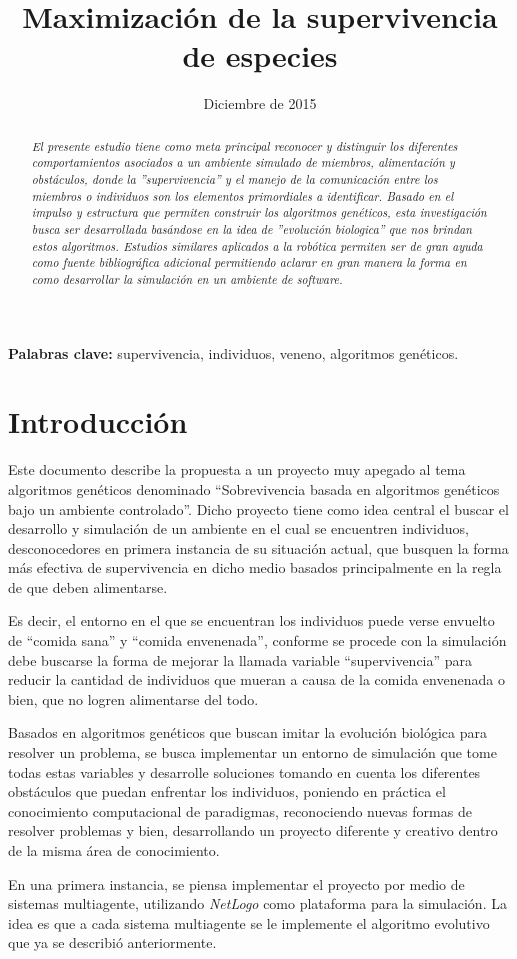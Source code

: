 \documentclass[times,10pt,twocolumn]{article}
\title{\textbf{Maximización de la supervivencia de especies}}
\author{Fabián Rodríguez$^1$ y José Pablo Ureña$^2$\\
   \emph{CI-1441 Paradigmas computacionales}\\
   \emph{Escuela de Ciencias de la Computación e Informática}\\
   \emph{Facultad de Ingeniería}\\
   \emph{Universidad de Costa Rica}\\
   $^1$\emph{\href{mailto:farodriguez.49@gmail.com}{farodriguez.49@gmail.com} }, $^2$\emph{\href{mailto:jp.urenag@gmail.com}{jp.urenag@gmail.com}}$}
\date{Diciembre de 2015}
\begin{document}
\maketitle

\begin{abstract}
\emph{El presente estudio tiene como meta principal reconocer y distinguir los diferentes comportamientos asociados a un ambiente simulado de miembros, alimentación y obstáculos, donde la ''supervivencia'' y el manejo de la comunicación entre los miembros o individuos son los elementos primordiales a identificar. Basado en el impulso y estructura que permiten construir los algoritmos genéticos, esta investigación busca ser desarrollada basándose en la idea de ''evolución biologica'' que nos brindan estos algoritmos. Estudios similares aplicados a la robótica permiten ser de gran ayuda como fuente bibliográfica adicional permitiendo aclarar en gran manera la forma en como desarrollar la simulación en un ambiente de software.}\\
\end{abstract}

\noindent \textbf{Palabras clave: }supervivencia, individuos, veneno, algoritmos genéticos. 

\section{Introducción}
  Este documento describe la propuesta a un proyecto muy apegado al tema algoritmos genéticos denominado “Sobrevivencia basada en algoritmos genéticos bajo un ambiente controlado”.
Dicho proyecto tiene como idea central el buscar el desarrollo y simulación de un ambiente en el cual se encuentren individuos, desconocedores en primera instancia de su situación actual, que busquen la forma más efectiva de supervivencia en dicho medio basados principalmente en la regla de que deben alimentarse.\par
Es decir, el entorno en el que se encuentran los individuos puede verse envuelto de “comida sana” y “comida envenenada”, conforme se procede con la simulación debe buscarse la forma de mejorar la llamada variable “supervivencia”  para reducir la cantidad de individuos que mueran a causa de la comida envenenada o bien, que no logren alimentarse del todo.\par
Basados en algoritmos genéticos que buscan imitar la evolución biológica para resolver un problema, se busca implementar un entorno de simulación que tome todas estas variables y desarrolle soluciones tomando en cuenta los diferentes obstáculos que puedan enfrentar los individuos, poniendo en práctica el conocimiento computacional de paradigmas, reconociendo nuevas formas de resolver problemas y bien, desarrollando un proyecto diferente y creativo dentro de la misma área de conocimiento.\par 
En una primera instancia, se piensa implementar el proyecto por medio de sistemas multiagente, utilizando \emph{NetLogo} como plataforma para la simulación. La idea es que a cada sistema multiagente se le implemente el algoritmo evolutivo que ya se describió anteriormente.
\end{document}
